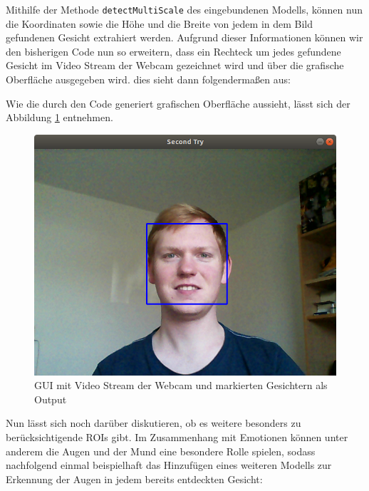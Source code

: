 \documentclass[12pt, a4paper]{scrbook}
\begin{document}

Mithilfe der Methode \texttt{detectMultiScale} des eingebundenen Modells, können nun die Koordinaten sowie die Höhe und die Breite von jedem in dem Bild gefundenen Gesicht extrahiert werden. Aufgrund dieser Informationen können wir den bisherigen Code nun so erweitern, dass ein Rechteck um jedes gefundene Gesicht im Video Stream der Webcam gezeichnet wird und über die grafische Oberfläche ausgegeben wird. dies sieht dann folgendermaßen aus:\newline

Wie die durch den Code generiert grafischen Oberfläche aussieht, lässt sich der Abbildung \ref{fig:Input GUI 2} entnehmen.
\begin{figure}[h]
\includegraphics[width=\linewidth]{Bilder/InputGUI2.png}
\caption{GUI mit Video Stream der Webcam und markierten Gesichtern als Output}
\label{fig:Input GUI 2}
\end{figure}
Nun lässt sich noch darüber diskutieren, ob es weitere besonders zu berücksichtigende ROIs gibt. Im Zusammenhang mit Emotionen können unter anderem die Augen und der Mund eine besondere Rolle spielen, sodass nachfolgend einmal beispielhaft das Hinzufügen eines weiteren Modells zur Erkennung der Augen in jedem bereits entdeckten Gesicht:

\end{document}
